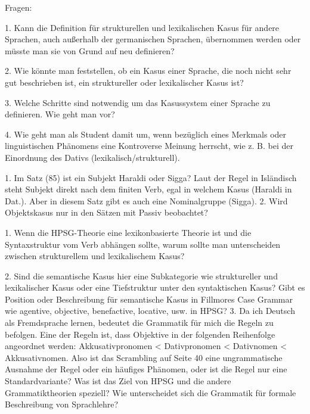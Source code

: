 
%



\appendix










Fragen:

1. Kann die Definition für strukturellen und lexikalischen Kasus für andere Sprachen, auch außerhalb der germanischen Sprachen, übernommen werden oder müsste man sie von Grund auf neu definieren? 

2. Wie könnte man feststellen, ob ein Kasus einer Sprache, die noch nicht sehr gut beschrieben ist, ein struktureller oder lexikalischer Kasus ist? 

3. Welche Schritte sind notwendig um das Kasussystem einer Sprache zu definieren. Wie geht man vor? 

4. Wie geht man als Student damit um, wenn bezüglich eines Merkmals oder linguistischen Phänomens eine Kontroverse Meinung herrscht, wie z. B. bei der Einordnung des Dativs (lexikalisch/strukturell).




1.	Im Satz (85) ist ein Subjekt Haraldi oder Sigga?
Laut der Regel in Isländisch steht Subjekt direkt nach dem finiten Verb, egal in welchem Kasus (Haraldi in Dat.). Aber in diesem Satz gibt es auch eine Nominalgruppe  (Sigga).
2.	Wird Objektskasus nur in den Sätzen mit Passiv beobachtet?
  



1. Wenn die HPSG-Theorie eine lexikonbasierte Theorie ist und die
Syntaxstruktur vom Verb abhängen sollte, warum sollte man unterscheiden
zwischen strukturellem und lexikalischem Kasus?

2. Sind die semantische Kasus hier eine Subkategorie wie struktureller und
lexikalischer Kasus oder eine Tiefstruktur unter den syntaktischen Kasus?
Gibt es Position oder Beschreibung für semantische Kasus in Fillmores Case
Grammar wie agentive, objective, benefactive, locative, usw. in HPSG? 3.
Da ich Deutsch als Fremdsprache lernen, bedeutet die Grammatik für mich
die Regeln zu befolgen. Eine der Regeln ist, dass Objektive in der
folgenden Reihenfolge angeordnet werden: Akkusativpronomen < Dativpronomen
< Dativnomen < Akkusativnomen.
Also ist das Scrambling auf Seite 40 eine ungrammatische Ausnahme der
Regel oder ein häufiges Phänomen, oder ist die Regel nur eine
Standardvariante? Was ist das Ziel von HPSG und die andere
Grammatiktheorien speziell? Wie unterscheidet sich die Grammatik für
formale Beschreibung von Sprachlehre?

